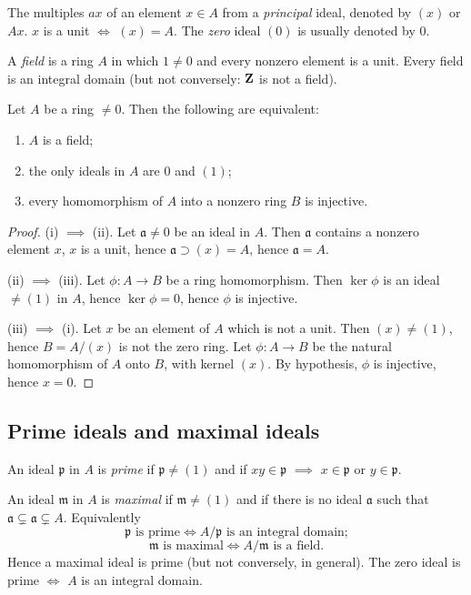 The multiples $ax$ of an element $x\in A$ from a
\emph{principal} ideal, denoted by $(x)$ or $Ax$. $x$ is a unit
$\iff$ $(x)=A$. The \emph{zero} ideal $(0)$ is usually denoted by
$0$.

A \emph{field} is a ring $A$ in which $1\neq 0$ and every nonzero
element is a unit. Every field is an integral domain (but not
conversely: $\mathbf{Z}$ is not a field).

\begin{proposition}
Let $A$ be a ring $\neq 0$. Then the following are equivalent:
\begin{enumerate}[noitemsep,label=(\roman*)]
\item $A$ is a field;
\item the only ideals in $A$ are $0$ and $(1)$;
\item every homomorphism of $A$ into a nonzero ring $B$ is
  injective.
\end{enumerate}
\end{proposition}
\begin{proof}
(i) $\implies$ (ii). Let $\mathfrak{a}\neq 0$ be an ideal in
$A$. Then $\mathfrak{a}$ contains a nonzero element $x$, $x$ is a
unit, hence $\mathfrak{a}\supset(x)=A$, hence $\mathfrak{a}=A$.

(ii) $\implies$ (iii). Let $\phi\colon A\to B$ be a ring
homomorphism. Then $\ker \phi$ is an ideal $\neq (1)$ in $A$,
hence $\ker\phi=0$, hence $\phi$ is injective.

(iii) $\implies$ (i). Let $x$ be an element of $A$ which is not a
unit. Then $(x)\neq(1)$, hence $B=A/(x)$ is not the zero ring. Let
$\phi\colon A\to B$ be the natural homomorphism of $A$ onto
$B$, with kernel $(x)$. By hypothesis, $\phi$ is injective,
hence $x=0$.
\end{proof}
\subsection{Prime ideals and maximal ideals}
An ideal $\mathfrak{p}$ in $A$ is \emph{prime} if
$\mathfrak{p}\neq(1)$ and if $xy\in\mathfrak{p}$ $\implies$
$x\in\mathfrak{p}$ or $y\in\mathfrak{p}$.

An ideal $\mathfrak{m}$ in $A$ is \emph{maximal} if
$\mathfrak{m}\neq(1)$ and if there is no ideal $\mathfrak{a}$ such
that $\mathfrak{a}\subsetneq\mathfrak{a}\subsetneq A$. Equivalently
\[
\text{$\mathfrak{p}$ is prime}\iff\text{$A/\mathfrak{p}$ is an
  integral domain;}
\]
\[
\text{$\mathfrak{m}$ is maximal}\iff\text{$A/\mathfrak{m}$ is a field.}
\]
Hence a maximal ideal is prime (but not conversely, in
general). The zero ideal is prime $\iff$ $A$ is an integral
domain.


